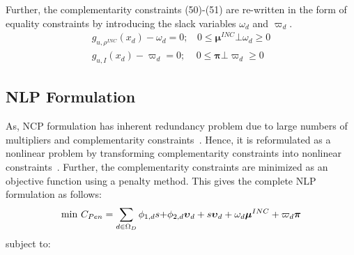 \documentclass[journal]{IEEEtran}
\begin{document}
Further, the complementarity constraints (50)-(51) are re-written in the form of equality constraints by introducing the slack variables ${\omega _d}$ and  ${\varpi _d}$. 
\begin{gather}
{g_{u,{\rho ^{INC}}}}({x_d}) - {\omega _d} = 0;~~~~
0 \le {\boldsymbol{\mu} ^{INC}} \bot {\omega _d} \ge 0\\
{g_{u,I}}({x_d}) - {\varpi _d} = 0;~~~~~0 \le \boldsymbol{\pi}  \bot {\varpi _d} \ge 0
\end{gather}
\subsection{NLP Formulation}
 As, NCP formulation has inherent redundancy problem due to large numbers of multipliers and complementarity constraints~\cite{su2004sequential}. Hence, it is reformulated as a nonlinear problem by transforming complementarity constraints into nonlinear constraints~\cite{su2004sequential}. Further, the complementarity constraints are minimized as an objective function using a penalty method. This gives the complete NLP formulation as follows: 
\begin{equation}
{\mathop{\rm min~}\nolimits} {\rm{  }}{C_{Pen}} = \sum\limits_{d \in {\Omega _D}} {{\phi _{1,d}}s + } {\phi _{2,d}}{\boldsymbol{\upsilon} _d} + s{\boldsymbol{\upsilon} _d} + {\omega _d}{\boldsymbol{\mu }^{INC}} + {\varpi _d}\boldsymbol{\pi} 
\end{equation}
subject to:
\end{document}
